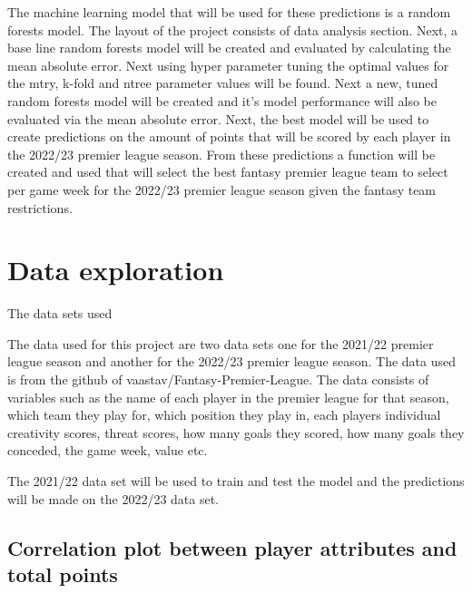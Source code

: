 \documentclass[11pt,preprint, authoryear]{elsarticle}
\numberwithin{equation}{section}
\numberwithin{figure}{section}
\numberwithin{table}{section}
\begin{document}
The machine learning model that will be used for these predictions is a
random forests model. The layout of the project consists of data
analysis section. Next, a base line random forests model will be created
and evaluated by calculating the mean absolute error. Next using hyper
parameter tuning the optimal values for the mtry, k-fold and ntree
parameter values will be found. Next a new, tuned random forests model
will be created and it's model performance will also be evaluated via
the mean absolute error. Next, the best model will be used to create
predictions on the amount of points that will be scored by each player
in the 2022/23 premier league season. From these predictions a function
will be created and used that will select the best fantasy premier
league team to select per game week for the 2022/23 premier league
season given the fantasy team restrictions.

\hypertarget{data-exploration}{%
\section{Data exploration}\label{data-exploration}}

The data sets used

The data used for this project are two data sets one for the 2021/22
premier league season and another for the 2022/23 premier league season.
The data used is from the github of vaastav/Fantasy-Premier-League. The
data consists of variables such as the name of each player in the
premier league for that season, which team they play for, which position
they play in, each players individual creativity scores, threat scores,
how many goals they scored, how many goals they conceded, the game week,
value etc.

The 2021/22 data set will be used to train and test the model and the
predictions will be made on the 2022/23 data set.

\hypertarget{correlation-plot-between-player-attributes-and-total-points}{%
\subsection{Correlation plot between player attributes and total
points}\label{correlation-plot-between-player-attributes-and-total-points}}
\end{document}
